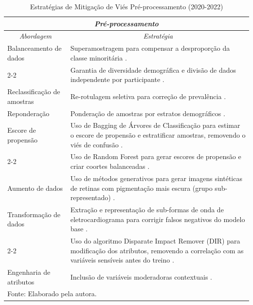 \newpage
\begin{longtable}{p{3cm}|p{11cm}}%
\caption{Estratégias de Mitigação de Viés Pré-processamento (2020-2022)} \label{tab:mitigacao_pre} \\

\hline
\multicolumn{2}{c}{\textit{Pré-processamento}} \\ \hline
\multicolumn{1}{c|}{\textit{Abordagem}} & \multicolumn{1}{c}{\textit{Estratégia}} %
\\ \hline
Balanceamento de dados &
Superamostragem para compensar a desproporção da classe minoritária \cite{zarei2022machine}.\\
\cline{2-2}
& Garantia de diversidade demográfica e divisão de dados independente por participante \cite{han2022sounds}. \\
\hline
Reclassificação de amostras & Re-rotulagem seletiva para correção de prevalência \cite{seker2022preprocessing}. \\
\hline
Reponderação &
Ponderação de amostras por estratos demográficos \cite{allen2020racially}. \\
\hline
Escore de propensão & Uso de Bagging de Árvores de Classificação para estimar o escore de propensão e estratificar amostras, removendo o viés de confusão \cite{otok2020propensity}.\\
\cline{2-2}
& Uso de Random Forest para gerar escores de propensão e criar coortes balanceadas \cite{chandak2020using}.\\
\hline
Aumento de dados &
Uso de métodos generativos para gerar imagens sintéticas de retinas com pigmentação mais escura (grupo sub-representado) \cite{burlina2021addressing}. \\
\hline
Transformação de dados &
Extração e representação de sub-formas de onda de eletrocardiograma para corrigir falsos negativos do modelo base \cite{honarvar2022enhancing}. \\
\cline{2-2}
& Uso do algoritmo Disparate Impact Remover (DIR) para modificação dos atributos, removendo a correlação com as variáveis sensíveis antes do treino \cite{park2022fairness}. \\
\hline
Engenharia \newline de atributos & Inclusão de variáveis moderadoras contextuais \cite{cohen2022natural}. \\
\hline
\multicolumn{2}{l}{\small Fonte: Elaborado pela autora.} \\ %
\end{longtable}

